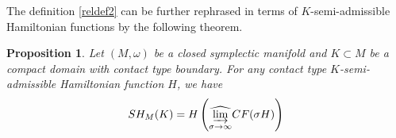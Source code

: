 \documentclass[12pt]{amsart}
\newtheorem{proposition}[theorem]{Proposition}
\theoremstyle{definition}
\begin{document}

 \vspace{0.2cm}
 
The definition \eqref{reldef2} can be further rephrased in terms of $K$-semi-admissible Hamiltonian functions by the following theorem.
\begin{proposition}\label{re1}
    Let $(M,\omega)$ be a closed symplectic manifold and $K \subset M$ be a compact domain with contact type boundary. For any contact type $K$-semi-admissible Hamiltonian function $H$, we have
    \begin{align*}
        SH_M(K) = H \left( \widehat{\varinjlim_{\sigma \to \infty}}CF(\sigma H)  \right)
    \end{align*}
\end{proposition}
\end{document}
